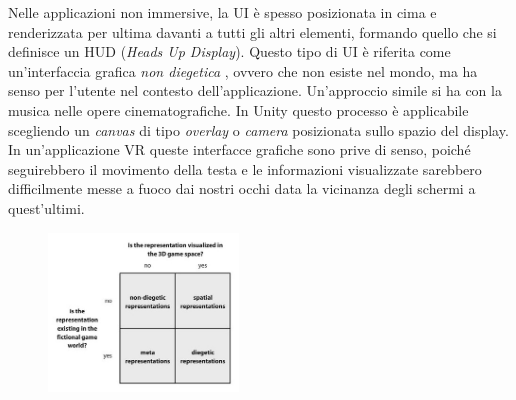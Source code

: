 Nelle applicazioni non immersive, la UI è spesso posizionata in cima e renderizzata per ultima davanti a tutti gli altri elementi, formando quello che si definisce un HUD (\textit{Heads Up Display}). Questo tipo di UI è riferita come un'interfaccia grafica \textit{non diegetica} , ovvero che non esiste nel mondo, ma ha senso per l'utente nel contesto dell'applicazione. Un'approccio simile si ha con la musica nelle opere cinematografiche. In Unity questo processo è applicabile scegliendo un \textit{canvas}  di tipo \textit{overlay} o \textit{camera} posizionata sullo spazio del display. In un'applicazione VR queste interfacce grafiche sono prive di senso, poiché seguirebbero il movimento della testa e le informazioni visualizzate sarebbero difficilmente messe a fuoco dai nostri occhi data la vicinanza degli schermi a quest'ultimi.\\

\begin{figure} %
	\centering
	\includegraphics[width=0.45\textwidth]{figure/diegetic}

\end{figure}


